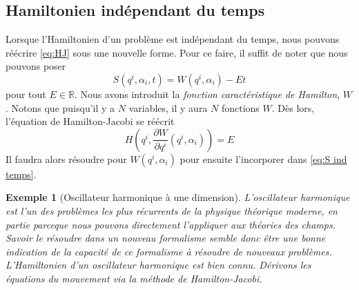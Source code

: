 \documentclass[11pt,oneside,a4paper]{article}
\newcommand{\dif}[2]{\frac{\partial #1}{\partial #2}}
\newtheorem{example}[theorem]{Exemple}
\begin{document}
    \subsection{Hamiltonien indépendant du temps}\label{sec:H ind t}

    Lorsque l'Hamiltonien d'un problème est indépendant du temps, nous pouvons réécrire \eqref{eq:HJ} sous une nouvelle forme. Pour ce faire, il suffit de noter que nous pouvons poser
    \begin{equation}
      S(q^i,\alpha_i,t) = W(q^i,\alpha_i) - Et\label{eq:S ind temps}
    \end{equation}
    pour tout $E\in\mathbb{R}$. Nous avons introduit la \emph{fonction caractéristique de Hamilton}, $W$. Notons que puisqu'il y a $N$ variables, il y aura $N$ fonctions $W$. Dès lors, l'équation de Hamilton-Jacobi se réécrit
    \begin{equation}
      H(q^i,\dif{W}{q^i}\left(q^i,\alpha_i\right) )= E\label{eq:HJ 2}
    \end{equation}
    Il faudra alors résoudre pour $W(q^i,\alpha_i)$ pour ensuite l'incorporer dans \eqref{eq:S ind temps}.

    \begin{example}[Oscillateur harmonique à une dimension]
      L'oscillateur harmonique est l'un des problèmes les plus récurrents de la physique théorique moderne, en partie parceque nous pouvons directement l'appliquer aux théories des champs. Savoir le résoudre dans un nouveau formalisme semble donc être une bonne indication de la capacité de ce formalisme à résoudre de nouveaux problèmes. L'Hamiltonien d'un oscillateur harmonique est bien connu. Dérivons les équations du mouvement via la méthode de Hamilton-Jacobi.
    \end{example}
\end{document}
